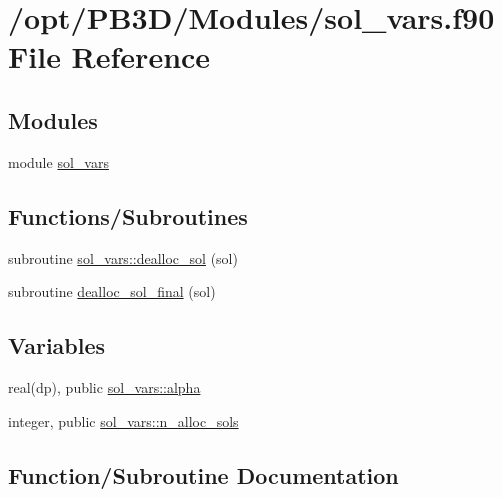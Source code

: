 \hypertarget{sol__vars_8f90}{}\section{/opt/\+P\+B3\+D/\+Modules/sol\+\_\+vars.f90 File Reference}
\label{sol__vars_8f90}
\subsection*{Modules}
\begin{DoxyCompactItemize}
\item 
module \hyperlink{namespacesol__vars}{sol\+\_\+vars}
\end{DoxyCompactItemize}
\subsection*{Functions/\+Subroutines}
\begin{DoxyCompactItemize}
\item 
subroutine \hyperlink{namespacesol__vars_a9ae65a5252aede548e5238e50c1bb2ba}{sol\+\_\+vars\+::dealloc\+\_\+sol} (sol)
\item 
subroutine \hyperlink{sol__vars_8f90_aaf387ea01074131d40eb2a8aada68fc3}{dealloc\+\_\+sol\+\_\+final} (sol)
\end{DoxyCompactItemize}
\subsection*{Variables}
\begin{DoxyCompactItemize}
\item 
real(dp), public \hyperlink{namespacesol__vars_adbe33095cf2396e4a5c9108d7d1dcf11}{sol\+\_\+vars\+::alpha}
\item 
integer, public \hyperlink{namespacesol__vars_a91634d69ba45b896816f40e9013ddc79}{sol\+\_\+vars\+::n\+\_\+alloc\+\_\+sols}
\end{DoxyCompactItemize}


\subsection{Function/\+Subroutine Documentation}
\mbox{\label{sol__vars_8f90_aaf387ea01074131d40eb2a8aada68fc3}} 
